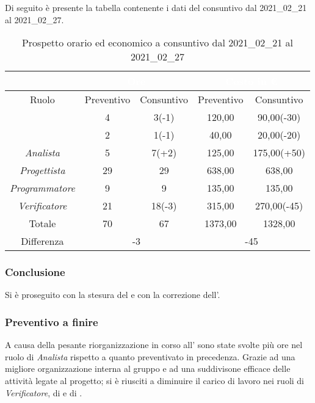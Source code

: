 Di seguito è presente la tabella contenente i dati del consuntivo dal 2021\_02\_21 al 2021\_02\_27.
\begin{table}[H]
	\centering
	\begin{tabular}{|c|c|c|c|c|}
		\rowcolor{darkblue} 
		&\multicolumn{2}{c|}{\textcolor{white}{Ore}}&\multicolumn{2}{c|}{\textcolor{white}{Costo in €}}\\ \hline
		Ruolo			&	Preventivo				&	Consuntivo		&	Preventivo	&	Consuntivo\\ \hline
		{\Responsabile}		&	4					&	3(-1)			&	120,00		&	90,00(-30) \\ \hline
		{\Amministratore}	&	2					&	1(-1)			&	40,00		&	20,00(-20) \\ \hline
		\textit{Analista}	&	5					&	7(+2)			&	125,00		&	175,00(+50) \\ \hline
		\textit{Progettista}& 	29					&   29 				& 	638,00		&  	638,00 \\ \hline
		\textit{Programmatore}& 9					& 	9				& 	135,00		&  	135,00 \\ \hline
		\textit{Verificatore}&	21					&	18(-3)			&	315,00		&	270,00(-45) \\ \hline
		Totale				&	70					&	67				&	1373,00		&	1328,00 \\ \hline
		Differenza			& 	\multicolumn{2}{c|}{-3} 				&\multicolumn{2}{c|}{-45}\\ \hline
	\end{tabular}
	\caption{Prospetto orario ed economico a consuntivo dal 2021\_02\_21 al 2021\_02\_27}
\end{table}
\subsubsection{Conclusione}
Si è proseguito con la stesura del  e con la correzione dell'\AdR{}.
\subsubsection{Preventivo a finire}
A causa della pesante riorganizzazione in corso all'{\AdR} sono state svolte più ore nel ruolo di \textit{Analista} rispetto a quanto preventivato in precedenza. Grazie ad una migliore organizzazione interna al gruppo e ad una suddivisone efficace delle attività legate al progetto; si è riusciti a diminuire il carico di lavoro nei ruoli di \textit{Verificatore}, di {\Responsabile} e di {\Amministratore}.

